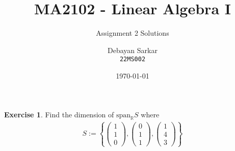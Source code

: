 \documentclass[10pt]{scrartcl}
\title{MA2102 - Linear Algebra I}
\subtitle{Assignment 2 Solutions}
\author{Debayan Sarkar \\ \texttt{22MS002}}
\date{\today}
\theoremstyle{definition}
\newtheorem{exercise}{Exercise}
\begin{document}
\maketitle
\begin{exercise}
    Find the dimension of $\text{span}_{\mathbb{R}}S$ where 
    \begin{gather*}
        S := \left\{
        \begin{pmatrix}
            1 \\
            1 \\
            0 
        \end{pmatrix}
        ,
        \begin{pmatrix}
            0 \\
            1 \\
            1 
        \end{pmatrix}
        ,
        \begin{pmatrix}
            1 \\
            4 \\
            3 
        \end{pmatrix}
        \right\}
    \end{gather*}
\end{exercise}
\end{document}
